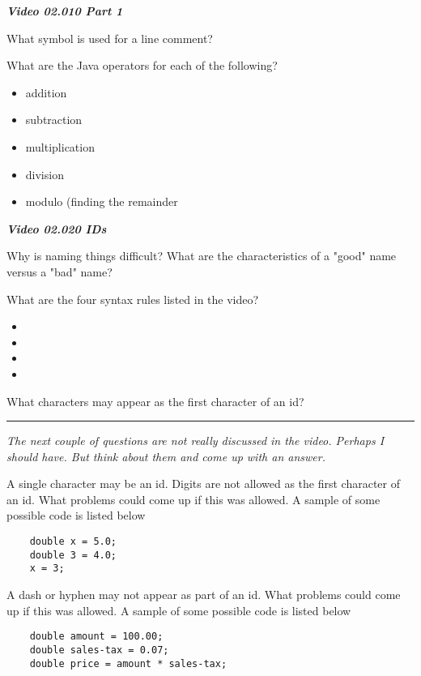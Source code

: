 \documentclass[letter,11pt]{exam}
\begin{document}
\textit{\textbf{Video 02.010 Part 1}}

\begin{questions}
\question What symbol is used for a line comment? \makebox[4em]{\hrulefill}

\begin{samepage}
\question What are the Java operators for each of the following?
\begin{itemize}
  \item \makebox[2em]{\hrulefill}   addition 
  \item \makebox[2em]{\hrulefill}    subtraction
  \item \makebox[2em]{\hrulefill}    multiplication
  \item \makebox[2em]{\hrulefill}    division
  \item \makebox[2em]{\hrulefill}   modulo (finding the remainder
\end{itemize}
\end{samepage}

\textit{\textbf{Video 02.020 IDs}}

 \question Why is naming things difficult?  What are the characteristics of a "good" name versus a "bad" name?
 \vspace{1.5cm}
 
  
 \begin{samepage}
 \question What are the four syntax rules listed in the video?
 \begin{itemize}
    \item 
    \item 
    \item 
    \item 
  \end{itemize}
 \end{samepage}
 \question What characters may appear as the first character of an id?

 \begin{samepage}
    \rule{1.\textwidth}{0.4pt}

\textit{The next couple of questions are not really discussed in the video.  Perhaps I should have.  But think about them and come up with an answer.}

 \question A single character may be an id.  Digits are not allowed as the first character of an id. What problems could come up if this was allowed.  A sample of some possible code is listed below
 \begin{verbatim}
    double x = 5.0;
    double 3 = 4.0;
    x = 3;
 \end{verbatim} 
 \question A dash or hyphen may not appear as part of an id.   What problems could come up if this was allowed.  A sample of some possible code is listed below
 \begin{verbatim}
    double amount = 100.00;
    double sales-tax = 0.07;
    double price = amount * sales-tax;
 \end{verbatim} 
\end{samepage}


\end{questions}
\end{document}
